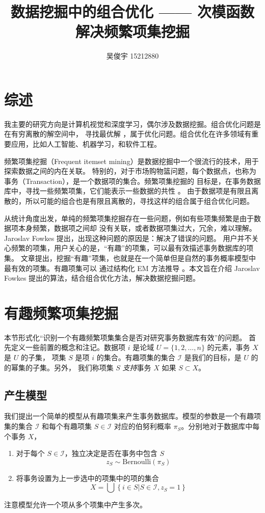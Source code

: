 \documentclass{ctexart}
\title{数据挖掘中的组合优化 —— 次模函数解决频繁项集挖掘}
\author{吴俊宇 15212880}
\newcommand{\scri}[0]{\mathcal{I}}
\begin{document}
\date{}
\maketitle
\tableofcontents
\pagebreak

\section{综述}

我主要的研究方向是计算机视觉和深度学习，偶尔涉及数据挖掘。组合优化问题是在有穷离散的解空间中，
寻找最优解 \cite{cop-wiki}，属于优化问题。组合优化在许多领域有重要应用，比如人工智能、机器学习，和软件工程。

频繁项集挖掘（Frequent itemset mining）是数据挖掘中一个很流行的技术，用于探索数据之间的内在关联。
特别的，对于市场购物篮问题，每个数据点，也称为事务（Transaction），是一个数据项的集合。频繁项集挖掘的
目标是，在事务数据库中，寻找一些频繁项集，它们能表示一些数据的共性 \cite{hjw-book}。
由于数据项是有限且离散的，所以可能的组合也是有限且离散的，寻找这样的组合属于组合优化问题。

从统计角度出发，单纯的频繁项集挖掘存在一些问题，例如有些项集频繁是由于数据项本身频繁，数据项之间却
没有关联，或者数据项集过大，冗余，难以理解。Jaroslav Fowkes 提出，出现这种问题的原因是：解决了错误的问题。
用户并不关心频繁的项集，用户关心的是，“有趣”的项集，可以最有效描述事务数据库的项集\cite{this-paper}。
文章提出，挖掘“有趣”项集，也就是在一个简单但是自然的事务概率模型中最有效的项集。有趣项集可以
通过结构化 EM 方法推导 \cite{em-book}。本文旨在介绍 Jaroslav Fowkes 提出的算法，结合组合优化方法，解决数据挖掘问题。

\section{有趣频繁项集挖掘}

本节形式化“识别一个有趣频繁项集集合是否对研究事务数据库有效”的问题。
首先定义一些前置的概念和注记。数据项 $i$ 是论域 $U = \{1, 2, \dots, n\}$ 的元素，事务 $X$ 是 $U$ 的子集，
项集 $S$ 是项 $i$ 的集合。有趣项集的集合 $\mathcal I$ 是我们的目标，是 $U$ 的的幂集的子集。另外，
我们称项集 $S$ \textit{支持}事务 $X$ 如果 $S \subset X$。

\subsection{产生模型}

我们提出一个简单的模型从有趣项集来产生事务数据库。模型的参数是一个有趣项集的集合 $\scri$ 和每个有趣项集
$S \in \scri$ 对应的伯努利概率 $\pi_S$。分别地对于数据库中每个事务 $X$，
\begin{enumerate}
	\item 对于每个 $S \in \scri$，独立决定是否在事务中包含 $S$
	$$
	z_S \sim \mathrm{Bernoulli}(\pi_S)
	$$
	\item 将事务设置为上一步选中的项集中的项的集合
	$$
	X = \bigcup \left\{ i \in S | S \in \scri, z_S = 1 \right\}
	$$
\end{enumerate}
注意模型允许一个项从多个项集中产生多次。
\end{document}
